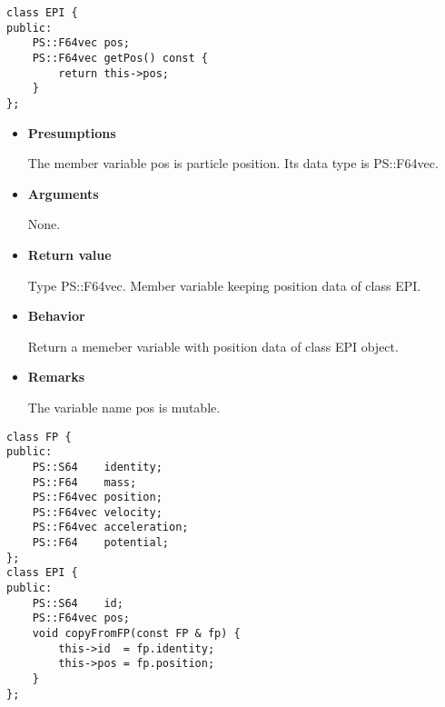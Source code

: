 
\begin{screen}
\begin{verbatim}
class EPI {
public:
    PS::F64vec pos;
    PS::F64vec getPos() const {
        return this->pos;
    }
};
\end{verbatim}
\end{screen}

\begin{itemize}

\item {\bf Presumptions}
  
  The member variable pos is particle position. Its data type is
  PS::F64vec.
  
\item {\bf Arguments}

  None.
  
\item {\bf Return value}

  Type PS::F64vec. Member variable keeping position data of class EPI.
  
\item {\bf Behavior}

  Return a memeber variable with position data of class EPI object.
  
\item {\bf Remarks}

  The variable name pos is mutable.

\end{itemize}


\begin{screen}
\begin{verbatim}
class FP {
public:
    PS::S64    identity;
    PS::F64    mass;
    PS::F64vec position;
    PS::F64vec velocity;
    PS::F64vec acceleration;
    PS::F64    potential;
};
class EPI {
public:
    PS::S64    id;
    PS::F64vec pos;
    void copyFromFP(const FP & fp) {
        this->id  = fp.identity;
        this->pos = fp.position;
    }
};
\end{verbatim}
\end{screen}

